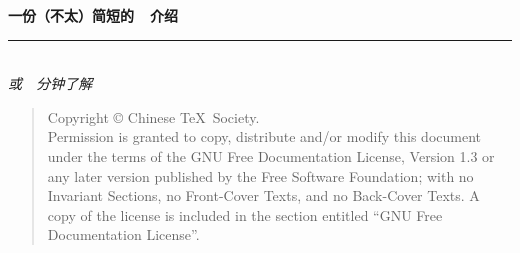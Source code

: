 \thispagestyle{empty}

\noindent\begin{minipage}{\textwidth}
\raggedleft
{\huge \bfseries 一份（不太）简短的~\LaTeXe{}~介绍}
\noindent\rule[-1ex]{\textwidth}{5pt}\\[2.5ex]
\hfill\emph{\Large 或~\pageref{lshort-minutes}~分钟了解~\LaTeXe}
\end{minipage}

\noindent{}


\newpage\thispagestyle{empty}
\begin{quote}\footnotesize
    Copyright \copyright{} {\the\year} Chinese \TeX\ Society. \\
    Permission is granted to copy, distribute and/or modify this document
    under the terms of the GNU Free Documentation License, Version 1.3
    or any later version published by the Free Software Foundation;
    with no Invariant Sections, no Front-Cover Texts, and no Back-Cover Texts.
    A copy of the license is included in the section entitled ``GNU
    Free Documentation License''.
\end{quote}